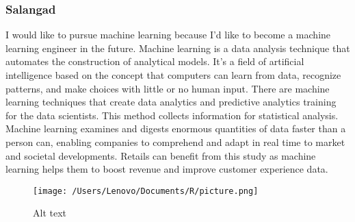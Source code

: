 \documentclass[
]{article}
\begin{document}
\hypertarget{salangad-2}{%
\subsubsection{Salangad}\label{salangad-2}}

I would like to pursue machine learning because I'd like to become a
machine learning engineer in the future. Machine learning is a data
analysis technique that automates the construction of analytical models.
It's a field of artificial intelligence based on the concept that
computers can learn from data, recognize patterns, and make choices with
little or no human input. There are machine learning techniques that
create data analytics and predictive analytics training for the data
scientists. This method collects information for statistical analysis.
Machine learning examines and digests enormous quantities of data faster
than a person can, enabling companies to comprehend and adapt in real
time to market and societal developments. Retails can benefit from this
study as machine learning helps them to boost revenue and improve
customer experience data.

\begin{figure}
\centering
\texttt{[image: /Users/Lenovo/Documents/R/picture.png]}
\caption{Alt text}
\end{figure}
\end{document}
